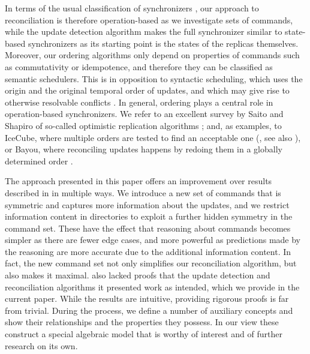 In terms of the usual classification of synchronizers \cite{TSR, PV, SSH},
our approach to reconciliation is therefore operation-based as we investigate sets of commands,
while the update detection algorithm makes the full synchronizer 
similar to state-based synchronizers 
as its starting point is the states of the replicas themselves.
Moreover, our ordering algorithms only depend on properties of commands 
such as commutativity or idempotence,
and therefore they can be classified as semantic schedulers.
This is in opposition to syntactic scheduling, which uses 
the origin and the original temporal order of updates, 
and which may give rise to otherwise resolvable conflicts \cite{SSH}.
In general, ordering plays a central role in operation-based synchronizers.
We refer to an excellent survey by Saito and Shapiro of so-called optimistic replication algorithms \cite{SSH};
and, as examples,
to IceCube, where multiple orders are tested to find an acceptable one (\cite{KRSD}, see also \cite{MPV}),
or Bayou, where reconciling updates happens by redoing them in a globally determined order \cite{TTPDSH}.

The approach presented in this paper offers an improvement
over results described in \cite{NREC} in multiple ways.
We introduce a new set of commands that is symmetric and
captures more information about the updates,
and we restrict information content in directories
to exploit a further hidden symmetry in the command set.
These have the effect that reasoning about commands
becomes simpler as there are fewer edge cases,
and more powerful as 
predictions made by the reasoning are more accurate
due to the additional information content.
In fact, the new command set not only simplifies
our reconciliation algorithm, but also makes it maximal.
\cite{NREC} also lacked proofs that the update detection
and reconciliation algorithms it presented work as intended,
which we provide in the current paper.
While the results are intuitive, providing rigorous proofs
is far from trivial.
During the process, we define a number of auxiliary concepts
and show their relationships and the properties they possess.
In our view these construct a special algebraic model
that is worthy of interest and of further research on its own.

